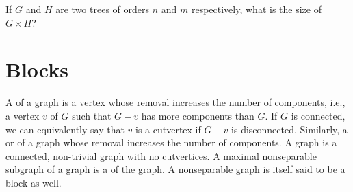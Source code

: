 \begin{Exercise}
If $G$ and $H$ are two trees of orders $n$ and $m$ respectively, what is the size of $G \times H$?
\end{Exercise}

\section{Blocks}\label{sec:Blocks}
A  of a graph is a vertex whose removal increases the number of components, i.e., a vertex $v$ of $G$ such that $G - v$ has more components than $G$. If $G$ is connected, we can equivalently say that $v$ is a cutvertex if $G - v$ is disconnected. Similarly, a  or  of a graph whose removal increases the number of components. A  graph is a connected, non-trivial graph with no cutvertices. A maximal nonseparable subgraph of a graph is a  of the graph. A nonseparable graph is itself said to be a block as well.

